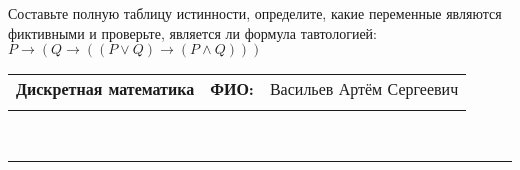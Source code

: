 \documentclass[10pt]{exam}
\newcommand{\class}{Дискретная математика}
\newcommand{\examdate}{}
\begin{document}
\begin{questions}
\begin{enumerate}[a)]
\end{enumerate}\question Составьте полную таблицу истинности, определите, какие переменные являются фиктивными и проверьте, является ли формула тавтологией:
$ P \rightarrow (Q \rightarrow ((P \lor Q) \rightarrow (P \land Q)))$

\end{questions}
\newpage
\begin{flushright}
\begin{tabular}{p{2.8in} r l}
\textbf{\class} & \textbf{ФИО:} &Васильев Артём Сергеевич
\\

\textbf{\examdate} &&\\
\end{tabular}\\
\end{flushright}
\rule[1ex]{\textwidth}{.1pt}
\end{document}
